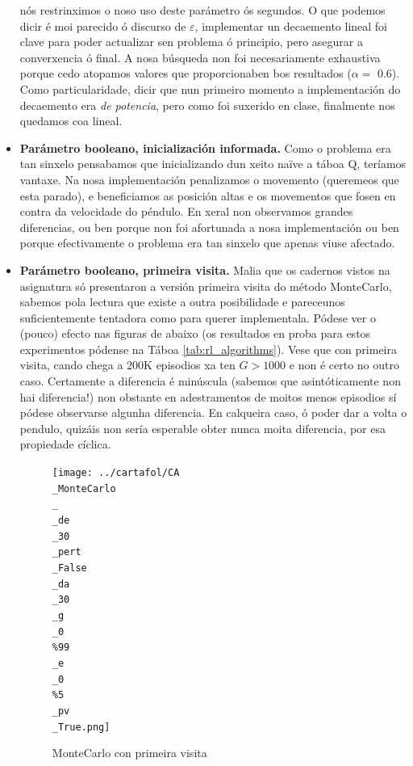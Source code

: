 \documentclass{article}
\begin{document}
\begin{itemize}
nós restrinximos o noso uso deste parámetro ós segundos. O que podemos dicir é moi parecido ó discurso de $\varepsilon$, implementar un decaemento lineal foi clave para poder actualizar sen problema ó principio, pero asegurar a converxencia ó final. A nosa búsqueda non foi necesariamente exhaustiva porque cedo atopamos valores que proporcionaben bos resultados ($\alpha =$ 0.6). Como particularidade, dicir que nun primeiro momento a implementación do decaemento era \emph{de potencia}, pero como foi suxerido en clase, finalmente nos quedamos coa lineal.

	\item \textbf{Parámetro booleano, inicialización informada.} Como o problema era tan sinxelo pensabamos que inicializando dun xeito naïve a táboa Q, teríamos vantaxe. Na nosa implementación penalizamos o movemento (queremeos que esta parado), e beneficiamos as posición altas e os movementos que fosen en contra da velocidade do péndulo. En xeral non observamos grandes diferencias, ou ben porque non foi afortunada a nosa implementación ou ben porque efectivamente o problema era tan sinxelo que apenas viuse afectado.
	\item \textbf{Parámetro booleano, primeira visita.} Malia que os cadernos vistos na asignatura só presentaron a versión primeira visita do método MonteCarlo, sabemos pola lectura \cite{Sutton1998} que existe a outra posibilidade e pareceunos suficientemente tentadora como para querer implementala. Pódese ver o (pouco) efecto nas figuras de abaixo (os resultados en proba para estos experimentos pódense na Táboa \ref{tab:rl_algorithms}). Vese que con primeira visita, cando chega a 200K episodios xa ten $G > 1000$ e non é certo no outro caso. Certamente a diferencia é minúscula (sabemos que asintóticamente non hai diferencia!) non obstante en adestramentos de moitos menos episodios sí pódese observarse algunha diferencia. En calqueira caso, ó poder dar a volta o pendulo, quizáis non sería esperable obter nunca moita diferencia, por esa propiedade cíclica.

		\begin{figure}[htbp]
    \centering
    \begin{minipage}{0.45\textwidth}
        \centering
	\texttt{[image: ../cartafol/CA\\\_MonteCarlo\\\_\\\_de\\\_30\\\_pert\\\_False\\\_da\\\_30\\\_g\\\_0\\\%99\\\_e\\\_0\\\%5\\\_pv\\\_True.png]}
\caption*{MonteCarlo con primeira visita}


\end{minipage}
\end{figure}
\end{itemize}
\end{document}
